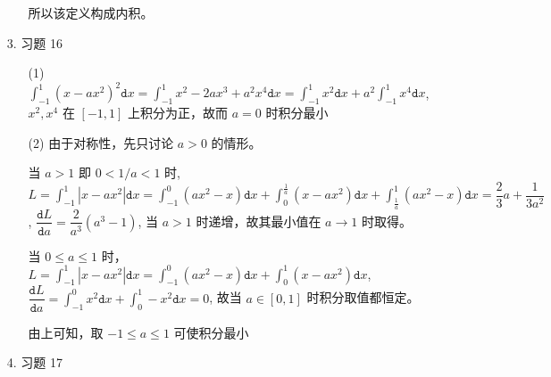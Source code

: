 \documentclass{article}
\newcommand{\dd}{\mathtt{d}}
\begin{document}
\begin{spacing}{1.5}
\begin{itemize}
\begin{itemize}
        所以该定义构成内积。
    \end{itemize}

    \item [3.] 习题 16
    
    \begin{itemize}
        \item [(1)] $\int_{-1}^{1} (x - ax^2)^2 \dd x = \int_{-1}^1 x^2 -2ax^3 + a^2x^4 \dd x = \int_{-1}^1 x^2 \dd x + a^2\int_{-1}^1 x^4 \dd x$, $x^2, x^4$ 在 $[-1, 1]$ 上积分为正，故而 $a=0$ 时积分最小
        \item [(2)] 由于对称性，先只讨论 $a>0$ 的情形。
        
        当 $a > 1$ 即 $0 < 1/a < 1$ 时, $L=\int_{-1}^1 |x-ax^2|\dd x = \int_{-1}^0 (ax^2 - x)\dd x + \int_{0}^{\frac{1}{a}} (x - ax^2) \dd x + \int_{\frac{1}{a}}^{1} (ax^2 - x) \dd x = \dfrac{2}{3}a + \dfrac{1}{3a^2}$, $\dfrac{\dd L}{\dd a} = \dfrac{2}{a^3}(a^3-1)$, 当 $a>1$ 时递增，故其最小值在 $a\to 1$ 时取得。
        
        当 $0\leq a \leq 1$ 时， $L=\int_{-1}^1 |x-ax^2|\dd x = \int_{-1}^0 (ax^2 - x)\dd x + \int_{0}^{1} (x - ax^2) \dd x$, $\dfrac{\dd L}{\dd a} = \int_{-1}^0 x^2\dd x +\int_{0}^{1}-x^2 \dd x = 0$, 故当 $a\in[0, 1]$ 时积分取值都恒定。

        由上可知，取 $-1\leq a \leq 1$ 可使积分最小
    \end{itemize}

    \item [4.] 习题 17
    

\end{itemize}
\end{spacing}
\end{document}
